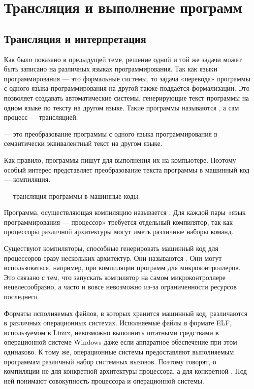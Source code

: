 \chapter{Трансляция и выполнение программ}

\section{Трансляция и интерпретация}

Как было показано в предыдущей теме, решение одной и той же задачи
может быть записано на различных языках программирования. Так как
языки программирования — это формальные системы, то задача «перевода»
программы с одного языка программирования на другой также поддаётся
формализации. Это позволяет создавать автоматические системы,
генерирующие текст программы на одном языке по тексту на другом
языке. Такие программы называются , а
сам процесс — трансляцией.

\begin{defn}
   — это преобразование программы с
  одного языка программирования в семантически эквивалентный текст на
  другом языке.
\end{defn}

Как правило, программы пишут для выполнения их на компьютере. Поэтому
особый интерес представляет преобразование текста программы в машинный
код — компиляция.

\begin{defn}
   — трансляция программы в машинные
  коды.
\end{defn}

Программа, осуществляющая компиляцию называется
.  Для каждой пары «язык
  программирования — процессор» требуется отдельный компилятор, так
как процессоры различной архитектуры могут иметь различные наборы
команд.

Существуют компиляторы, способные генерировать машинный код для
процессоров сразу нескольких архитектур. Они называются
.  Они могут
использоваться, например, при компиляции программ для
микроконтроллеров.  Это связано с тем, что запускать компилятор на
самом микроконтроллере нецелесообразно, а часто и вовсе невозможно
из-за ограниченности ресурсов последнего.

Форматы исполняемых файлов, в которых хранится машинный код,
различаются в различных операционных системах. Исполняемые файлы в
формате ELF, используемом в Linux, невозможно выполнить штатными
средствами в операционной системе Windows даже если аппаратное
обеспечение при этом одинаково. К тому же, операционные системы
предоставляют выполняемым программам различный набор системных
вызовов. Поэтому говорят, о компиляции не для конкретной архитектуры
процессора, а для конкретной
. Под ней понимают совокупность процессора и операционной
системы.

